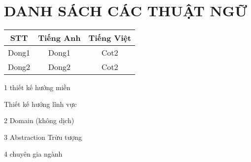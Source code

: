 \newpage

\chapter*{\centering DANH SÁCH CÁC THUẬT NGỮ}




\begin{table}[h]

\centering

\begin{tabular}{|c|c|c|}

\hline

STT & Tiếng Anh & Tiếng Việt \\

\hline

Dong1 & Dong1 & Cot2 \\

\hline

Dong2 & Dong2 & Cot2 \\

\hline

\end{tabular}

\end{table}

\newpage









1 thiết kế hướng miền

Thiết kế hướng lĩnh vực

2 Domain (không dịch)

3 Abstraction Trừu tượng

4 chuyên gia ngành